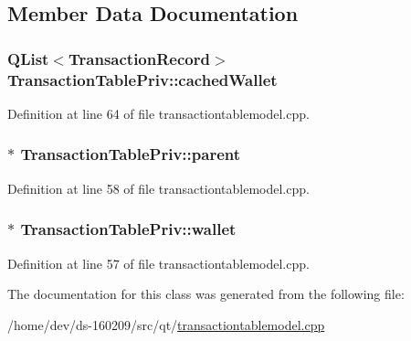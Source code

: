 \subsection{Member Data Documentation}
\hypertarget{class_transaction_table_priv_a410380e0d05152cf1d121f0ba0727ea8}{}
\subsubsection[{cached\+Wallet}]{\setlength{\rightskip}{0pt plus 5cm}Q\+List$<${\bf Transaction\+Record}$>$ Transaction\+Table\+Priv\+::cached\+Wallet}\label{class_transaction_table_priv_a410380e0d05152cf1d121f0ba0727ea8}


Definition at line 64 of file transactiontablemodel.\+cpp.

\hypertarget{class_transaction_table_priv_a358d460cf7c3074fba12d03cdc5f638d}{}
\subsubsection[{parent}]{$\ast$ Transaction\+Table\+Priv\+::parent}\label{class_transaction_table_priv_a358d460cf7c3074fba12d03cdc5f638d}


Definition at line 58 of file transactiontablemodel.\+cpp.

\hypertarget{class_transaction_table_priv_a01cb7d238e5dea44b9f7f1ee75d5849d}{}
\subsubsection[{wallet}]{$\ast$ Transaction\+Table\+Priv\+::wallet}\label{class_transaction_table_priv_a01cb7d238e5dea44b9f7f1ee75d5849d}


Definition at line 57 of file transactiontablemodel.\+cpp.



The documentation for this class was generated from the following file\+:\begin{DoxyCompactItemize}
\item 
/home/dev/ds-\/160209/src/qt/\hyperlink{transactiontablemodel_8cpp}{transactiontablemodel.\+cpp}\end{DoxyCompactItemize}
